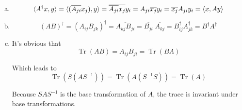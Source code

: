 \documentclass[a4paper,german,12pt,smallheadings]{scrartcl}
\DeclareMathOperator{\Tr}{Tr}
\begin{document}
\begin{enumerate}[a)]
  \item
    \begin{equation*}
      \braket{A^\dagger x, y} =
      \braket{(\overline{A_{ji}} x_j), y} =
      \overline{\overline{A_{ji}} x_j} y_i =
      A_{ji} \overline{x_j} y_i =
      \overline{x_j} A_{ji} y_i =
      \braket{x, Ay}
    \end{equation*}
  \item
    \begin{equation*}
      (AB)^\dagger = 
      (A_{ij}B_{jk})^\dagger =
      \overline{A_{kj}B_{ji}} =
      \overline{B_{ji}}\;\overline{A_{kj}} =
      B^\dagger_{ij} A^\dagger_{jk} =
      B^\dagger A^\dagger
    \end{equation*}
  \item
    It's obvious that
    \begin{equation*}
      \Tr(AB) = A_{ij}B_{ji} = \Tr(BA)
    \end{equation*}

    Which leads to
    \begin{equation*}
      \Tr(S(AS^{-1})) = \Tr(A (S^{-1}S)) = \Tr(A)
    \end{equation*}

    Because $SAS^{-1}$ is the base transformation of $A$, the trace is
    invariant under base transformations.
\end{enumerate}
\end{document}
